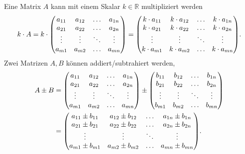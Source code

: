 Eine Matrix $A$ kann mit einem Skalar $k \in \mathbb{R}$ multipliziert werden 
\begin{align}
    k\cdot A = k\cdot \mqty(a_{11} & a_{12} & \hdots & a_{1n} \\
    a_{21} & a_{22} & \hdots & a_{2n} \\
    \vdots & \vdots & \ddots & \vdots \\
    a_{m1} & a_{m2} & \hdots & a_{mn}) = \mqty(k \cdot a_{11} & k \cdot a_{12} & \hdots & k \cdot a_{1n} \\
    k \cdot a_{21} & k \cdot a_{22} & \hdots & k \cdot a_{2n} \\
    \vdots & \vdots & \ddots & \vdots \\
    k \cdot a_{m1} & k \cdot a_{m2} & \hdots & k \cdot a_{mn}).
\end{align}
Zwei Matrizen $A,B$ können addiert/subtrahiert werden, 
\begin{align}
    A \pm B &= \mqty(a_{11} & a_{12} & \hdots & a_{1n} \\
    a_{21} & a_{22} & \hdots & a_{2n} \\
    \vdots & \vdots & \ddots & \vdots \\
    a_{m1} & a_{m2} & \hdots & a_{mn}) \pm \mqty(b_{11} & b_{12} & \hdots & b_{1n} \\
    b_{21} & b_{22} & \hdots & b_{2n} \\
    \vdots & \vdots & \ddots & \vdots \\
    b_{m1} & b_{m2} & \hdots & b_{mn}) \notag \\
    &= \mqty(a_{11} \pm b_{11} & a_{12} \pm b_{12}& \hdots & a_{1n} \pm b_{1n}\\
    a_{21} \pm b_{21}& a_{22} \pm b_{22}& \hdots & a_{2n} \pm b_{2n}\\
    \vdots & \vdots & \ddots & \vdots \\
    a_{m1} \pm b_{m1}& a_{m2} \pm b_{m2}& \hdots & a_{mn}\pm b_{mn}).
\end{align}


